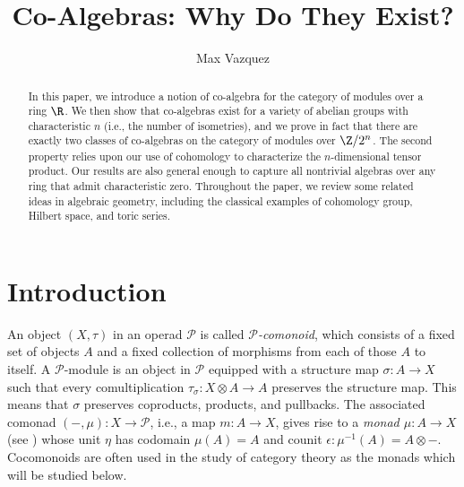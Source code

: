 \documentclass[a4paper,reqno,oneside]{article}
\begin{document}
\title{Co-Algebras: Why Do They Exist?}
\author{Max Vazquez}
\maketitle


\begin{abstract}
    In this paper, we introduce a notion of co-algebra for the category of modules over a ring $\R$.  We then show that co-algebras exist for a variety of abelian groups with characteristic $n$ (i.e., the number of isometries), and we prove in fact that there are exactly two classes of co-algebras on the category of modules over $\Z/2^n$.  The second property relies upon our use of cohomology to characterize the $n$-dimensional tensor product.  Our results are also general enough to capture all nontrivial algebras over any ring that admit characteristic zero.  Throughout the paper, we review some related ideas in algebraic geometry, including the classical examples of cohomology group, Hilbert space, and toric series.
\end{abstract}

\setcounter{tocdepth}{2}
\tableofcontents
\section{Introduction}
An object $(X,\tau)$ in an operad $\mathcal{P}$ is called \emph{$\mathcal{P}$-comonoid}, which consists of a fixed set of objects $A$ and a fixed collection of morphisms from each of those $A$ to itself.  A $\mathcal{P}$-module is an object in $\mathcal{P}$ equipped with a structure map $\sigma : A \to X$ such that every comultiplication $\tau_\sigma : X \otimes A \to A$ preserves the structure map.  This means that $\sigma$ preserves coproducts, products, and pullbacks.  The associated comonad $(-,\mu) : X \to \mathcal{P}$, i.e., a map $m : A \to X$, gives rise to a \emph{monad $\mu : A \to X$} (see \cite[Chapter III.5]{BourkeBook}) whose unit $\eta$ has codomain $\mu(A) = A$ and counit $\epsilon : \mu^{-1}(A) = A \otimes -$.  Cocomonoids are often used in the study of category theory as the monads which will be studied below.  
\end{document}
